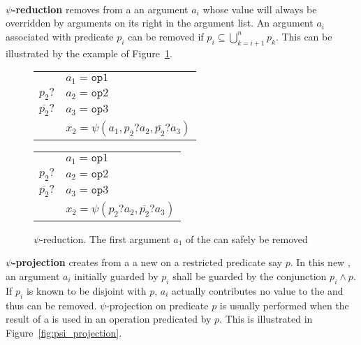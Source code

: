 ~\\
{\bf $\psi$-reduction} removes from a \psifun an
  argument ${a_i}$ whose value will always be overridden by arguments on
  its right in the argument list. An argument ${a_i}$ associated
  with predicate ${p_i}$ can be removed if ${p_i \subseteq
    \bigcup_{k=i+1}^n p_k}$. This can be illustrated by the example of
  Figure~\ref{fig:psi_reduction}.



\begin{figure}[h]
\begin{center}
\footnotesize
\hfill
\begin{tabular}{ll}
             & ${a_1 = \texttt{op}1}$  \\
${p_2?}$ & ${a_2 = \texttt{op}2}$        \\
${\overline{p_2}?}$ & ${a_3 = \texttt{op}3}$ \\
             & ${x_2 = \psi(a_1, p_2?a_2, \overline{p_2}?a_3)}$\\
\end{tabular}\hfill
\begin{tabular}{ll}
      & ${a_1 = \texttt{op}1}$ \\
 ${p_2?}$ & ${a_2 = \texttt{op}2}$ \\
 ${\overline{p_2}?}$ & ${a_3 = \texttt{op}3}$ \\
        &${x_2 = \psi(p_2?a_2, \overline{p_2}?a_3)}$ \\
\end{tabular}
\caption{$\psi$-reduction. The first argument  $a_1$ of the \psifun can safely be removed}
\label{fig:psi_reduction}
\end{center}
\end{figure}

\textbf{$\psi$-projection} creates from a \psifun a
  new \psifun on a restricted predicate say $p$.  In this new \psifun, an argument ${a_i}$ initially guarded by $p_i$ shall be guarded by the conjunction $p_i\wedge p$. If $p_i$ is known to be disjoint with $p$, $a_i$ actually
  contributes no value to the \psifun and thus can be
  removed. $\psi$-projection on predicate $p$ is usually performed when the result of a \psifun is used in an operation predicated by $p$. This is illustrated in Figure~\ref{fig:psi_projection}.

